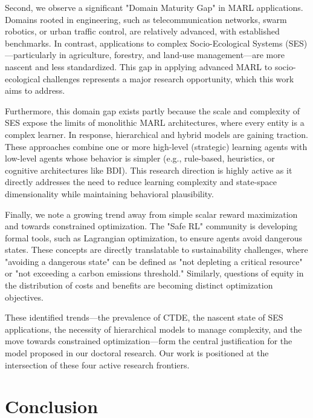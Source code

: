 \documentclass[conference]{IEEEtran}
\begin{document}
Second, we observe a significant "Domain Maturity Gap" in MARL applications. Domains rooted in engineering, such as telecommunication networks, swarm robotics, or urban traffic control, are relatively advanced, with established benchmarks. In contrast, applications to complex Socio-Ecological Systems (SES)---particularly in agriculture, forestry, and land-use management---are more nascent and less standardized. This gap in applying advanced MARL to socio-ecological challenges represents a major research opportunity, which this work aims to address.

Furthermore, this domain gap exists partly because the scale and complexity of SES expose the limits of monolithic MARL architectures, where every entity is a complex learner. In response, hierarchical and hybrid models are gaining traction. These approaches combine one or more high-level (strategic) learning agents with low-level agents whose behavior is simpler (e.g., rule-based, heuristics, or cognitive architectures like BDI). This research direction is highly active as it directly addresses the need to reduce learning complexity and state-space dimensionality while maintaining behavioral plausibility.

Finally, we note a growing trend away from simple scalar reward maximization and towards constrained optimization. The "Safe RL" community is developing formal tools, such as Lagrangian optimization, to ensure agents avoid dangerous states. These concepts are directly translatable to sustainability challenges, where "avoiding a dangerous state" can be defined as "not depleting a critical resource" or "not exceeding a carbon emissions threshold." Similarly, questions of equity in the distribution of costs and benefits are becoming distinct optimization objectives.

These identified trends---the prevalence of CTDE, the nascent state of SES applications, the necessity of hierarchical models to manage complexity, and the move towards constrained optimization---form the central justification for the model proposed in our doctoral research. Our work is positioned at the intersection of these four active research frontiers.

\section{Conclusion}
\end{document}
